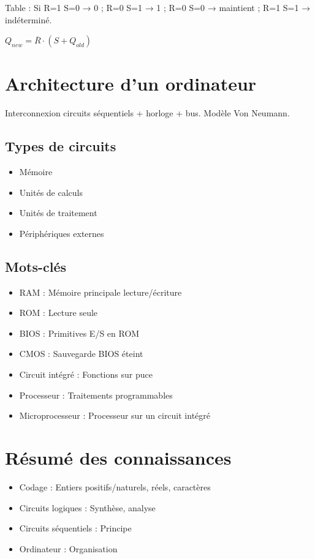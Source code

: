 \documentclass[12pt,a4paper]{article}
\begin{document}
\begin{methode}
Table : Si R=1 S=0 → 0 ; R=0 S=1 → 1 ; R=0 S=0 → maintient ; R=1 S=1 → indéterminé.
\end{methode}

\begin{definition}
$Q_{new} = \overline{R} \cdot (S + Q_{old})$
\end{definition}

\newpage
\section{Architecture d'un ordinateur}

\begin{definition}
Interconnexion circuits séquentiels + horloge + bus. Modèle Von Neumann.
\end{definition}

\subsection{Types de circuits}
\begin{itemize}
    \item Mémoire
    \item Unités de calculs
    \item Unités de traitement
    \item Périphériques externes
\end{itemize}

\subsection{Mots-clés}
\begin{definition}
\begin{itemize}
    \item RAM : Mémoire principale lecture/écriture
    \item ROM : Lecture seule
    \item BIOS : Primitives E/S en ROM
    \item CMOS : Sauvegarde BIOS éteint
    \item Circuit intégré : Fonctions sur puce
    \item Processeur : Traitements programmables
    \item Microprocesseur : Processeur sur un circuit intégré
\end{itemize}
\end{definition}

\section{Résumé des connaissances}
\begin{itemize}
    \item Codage : Entiers positifs/naturels, réels, caractères
    \item Circuits logiques : Synthèse, analyse
    \item Circuits séquentiels : Principe
    \item Ordinateur : Organisation
\end{itemize}
\end{document}
